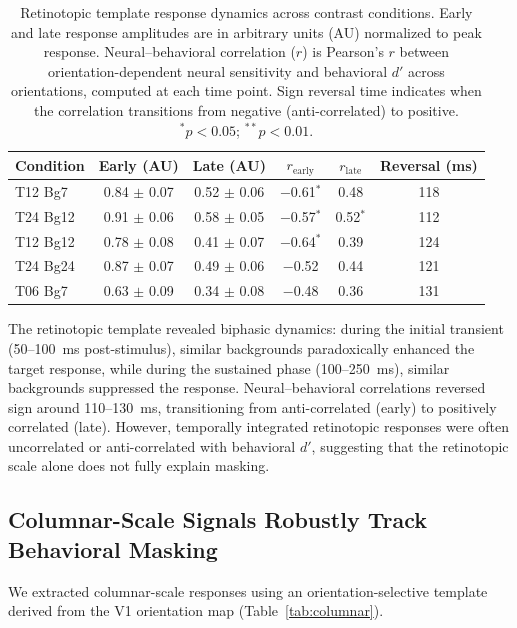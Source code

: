 \documentclass[11pt]{article}
\begin{document}
\begin{table}[H]
\centering
\caption{Retinotopic template response dynamics across contrast conditions. Early and late response amplitudes are in arbitrary units (AU) normalized to peak response. Neural--behavioral correlation ($r$) is Pearson's $r$ between orientation-dependent neural sensitivity and behavioral $d'$ across orientations, computed at each time point. Sign reversal time indicates when the correlation transitions from negative (anti-correlated) to positive. $^{\ast}p < 0.05$; $^{\ast\ast}p < 0.01$.}
\label{tab:retinotopic}
\begin{tabular}{lccccc}
\toprule
\textbf{Condition} & \textbf{Early (AU)} & \textbf{Late (AU)} & \textbf{$r_{\mathrm{early}}$} & \textbf{$r_{\mathrm{late}}$} & \textbf{Reversal (ms)} \\
\midrule
T12 Bg7 & 0.84 $\pm$ 0.07 & 0.52 $\pm$ 0.06 & $-$0.61$^{\ast}$ & 0.48 & 118 \\
T24 Bg12 & 0.91 $\pm$ 0.06 & 0.58 $\pm$ 0.05 & $-$0.57$^{\ast}$ & 0.52$^{\ast}$ & 112 \\
T12 Bg12 & 0.78 $\pm$ 0.08 & 0.41 $\pm$ 0.07 & $-$0.64$^{\ast}$ & 0.39 & 124 \\
T24 Bg24 & 0.87 $\pm$ 0.07 & 0.49 $\pm$ 0.06 & $-$0.52 & 0.44 & 121 \\
T06 Bg7 & 0.63 $\pm$ 0.09 & 0.34 $\pm$ 0.08 & $-$0.48 & 0.36 & 131 \\
\bottomrule
\end{tabular}
\end{table}

The retinotopic template revealed biphasic dynamics: during the initial transient (50--100~ms post-stimulus), similar backgrounds paradoxically enhanced the target response, while during the sustained phase (100--250~ms), similar backgrounds suppressed the response. Neural--behavioral correlations reversed sign around 110--130~ms, transitioning from anti-correlated (early) to positively correlated (late). However, temporally integrated retinotopic responses were often uncorrelated or anti-correlated with behavioral $d'$, suggesting that the retinotopic scale alone does not fully explain masking.

\subsection{Columnar-Scale Signals Robustly Track Behavioral Masking}

We extracted columnar-scale responses using an orientation-selective template derived from the V1 orientation map (Table~\ref{tab:columnar}).
\end{document}
